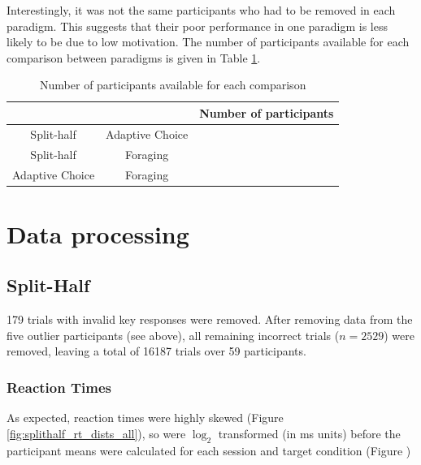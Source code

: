 \documentclass[a4paper, oneside, 11pt, onecolumn]{article}
\begin{document}
Interestingly, it was not the same participants who had to be removed in each paradigm. This suggests that their poor performance in one paradigm is less likely to be due to low motivation. The number of participants available for each comparison between paradigms is given in Table \ref{tab:num_per_paradigm}.

\begin{table}
\centering
\small
\begin{tabular}{cc|c}
 			&					& Number of participants\\
\hline
Split-half 	& Adaptive Choice 	& \\
Split-half 	& Foraging 			& \\
Adaptive Choice & Foraging 		& \\
\end{tabular}
\caption{Number of participants available for each comparison}
\label{tab:num_per_paradigm}
\end{table}

\section{Data processing}

\subsection{Split-Half}

179 trials with invalid key responses were removed. After removing data from the five outlier participants (see above), all remaining incorrect trials ($n=2529$) were removed, leaving a total of 16187 trials over 59 participants.

\subsubsection{Reaction Times}
As expected, reaction times were highly skewed (Figure \ref{fig:splithalf_rt_dists_all}), so were $\log_2$ transformed (in ms units) before the participant means were calculated for each session and target condition (Figure )
\end{document}
